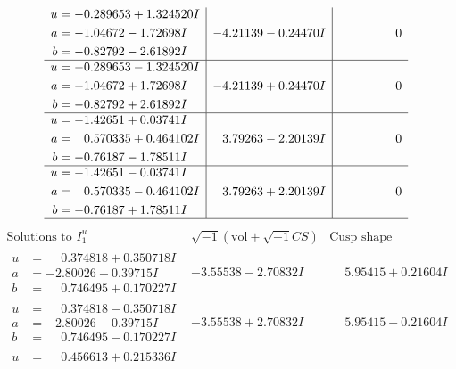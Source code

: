 \documentclass[1p]{elsarticle_modified}
\theoremstyle{definition}
\newcommand{\I}{\sqrt{-1}}
\begin{document}
$$\begin{array}{c|c|c}
\begin{aligned}
u &= -0.289653 + 1.324520 I \\
a &= -1.04672 - 1.72698 I \\
b &= -0.82792 - 2.61892 I\end{aligned}
 & -4.21139 - 0.24470 I & \phantom{-0.000000 } 0 \\ \hline\begin{aligned}
u &= -0.289653 - 1.324520 I \\
a &= -1.04672 + 1.72698 I \\
b &= -0.82792 + 2.61892 I\end{aligned}
 & -4.21139 + 0.24470 I & \phantom{-0.000000 } 0 \\ \hline\begin{aligned}
u &= -1.42651 + 0.03741 I \\
a &= \phantom{-}0.570335 + 0.464102 I \\
b &= -0.76187 - 1.78511 I\end{aligned}
 & \phantom{-}3.79263 - 2.20139 I & \phantom{-0.000000 } 0 \\ \hline\begin{aligned}
u &= -1.42651 - 0.03741 I \\
a &= \phantom{-}0.570335 - 0.464102 I \\
b &= -0.76187 + 1.78511 I\end{aligned}
 & \phantom{-}3.79263 + 2.20139 I & \phantom{-0.000000 } 0\\
 \hline 
 \end{array}$$\newpage$$\begin{array}{c|c|c}  
\text{Solutions to }I^u_{1}& \I (\text{vol} + \sqrt{-1}CS) & \text{Cusp shape}\\
 \hline 
\begin{aligned}
u &= \phantom{-}0.374818 + 0.350718 I \\
a &= -2.80026 + 0.39715 I \\
b &= \phantom{-}0.746495 + 0.170227 I\end{aligned}
 & -3.55538 - 2.70832 I & \phantom{-}5.95415 + 0.21604 I \\ \hline\begin{aligned}
u &= \phantom{-}0.374818 - 0.350718 I \\
a &= -2.80026 - 0.39715 I \\
b &= \phantom{-}0.746495 - 0.170227 I\end{aligned}
 & -3.55538 + 2.70832 I & \phantom{-}5.95415 - 0.21604 I \\ \hline\begin{aligned}
u &= \phantom{-}0.456613 + 0.215336 I \\

\end{aligned}
\end{array}$$
\end{document}
